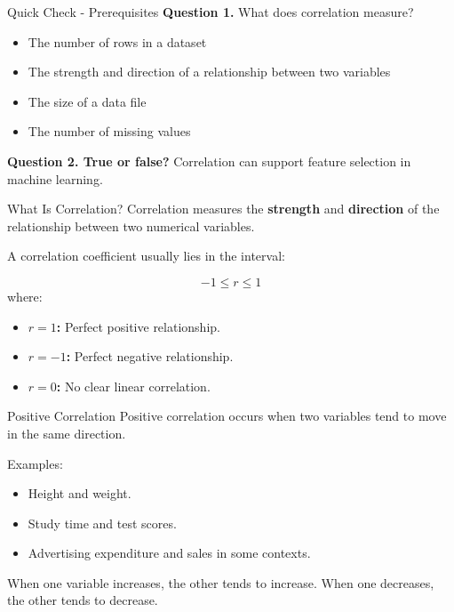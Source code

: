 \documentclass[aspectratio=169,11pt]{beamer}
\begin{document}
\begin{frame}[allowframebreaks]{Quick Check - Prerequisites}
\footnotesize
\textbf{Question 1.} What does correlation measure?\par\medskip
\begin{itemize}
\item[\textbf{A.}] The number of rows in a dataset
\item[\textbf{B.}] The strength and direction of a relationship between two variables
\item[\textbf{C.}] The size of a data file
\item[\textbf{D.}] The number of missing values
\end{itemize}
\textbf{Question 2. True or false?} Correlation can support feature selection in machine learning.\par\medskip
\end{frame}
\begin{frame}[allowframebreaks]{What Is Correlation?}
\small
Correlation measures the \textbf{strength} and \textbf{direction} of the relationship between two numerical variables.\par\medskip
A correlation coefficient usually lies in the interval:\par\medskip
\[
-1 \leq r \leq 1
\]
where:\par\medskip
\begin{itemize}
\item \textbf{\(r=1\):} Perfect positive relationship.
\item \textbf{\(r=-1\):} Perfect negative relationship.
\item \textbf{\(r=0\):} No clear linear correlation.
\end{itemize}
\end{frame}
\begin{frame}[allowframebreaks]{Positive Correlation}
\small
Positive correlation occurs when two variables tend to move in the same direction.\par\medskip
Examples:\par\medskip
\begin{itemize}
\item Height and weight.
\item Study time and test scores.
\item Advertising expenditure and sales in some contexts.
\end{itemize}
When one variable increases, the other tends to increase. When one decreases, the other tends to decrease.\par\medskip
\end{frame}
\end{document}
